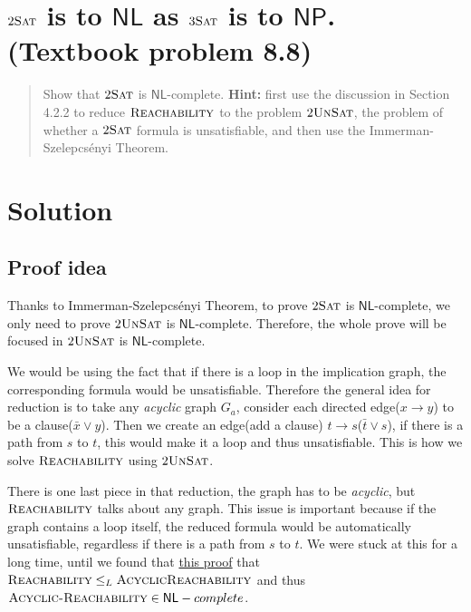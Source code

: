 
\newtheorem{theorem}{Theorem}

\maketitle
\thispagestyle{firststyle}
\vspace{-2.0cm}

\section{$2\textsc{Sat}$ is to $\mathsf{NL}$ as $3\textsc{Sat}$ is to $\mathsf{NP}$. (Textbook problem 8.8)}
\begin{quote}
    Show that $2\textsc{Sat}$ is $\mathsf{NL}$-complete.
    {\bf Hint:} first use the discussion in Section 4.2.2 to reduce
    $\textsc{Reachability}$ to the problem $2\textsc{UnSat}$,
    the problem of whether a $2\textsc{Sat}$ formula is unsatisfiable,
    and then use the Immerman-Szelepcs\'{e}nyi Theorem.
\end{quote}

\section*{Solution}

\subsection*{Proof idea}

Thanks to Immerman-Szelepcs\'{e}nyi Theorem, to prove $2\textsc{Sat}$ is $\mathsf{NL}$-complete, we only need to prove $2\textsc{UnSat}$ is $\mathsf{NL}$-complete.
Therefore, the whole prove will be focused in $2\textsc{UnSat}$ is $\mathsf{NL}$-complete.

We would be using the fact that if there is a loop in the implication graph, the corresponding formula would be unsatisfiable.
Therefore the general idea for reduction is to take any \textit{acyclic} graph $G_a$, consider each directed edge($x \rightarrow y$) to be a clause($\bar{x} \vee y$).
Then we create an edge(add a clause) $t \rightarrow s$($\bar{t} \vee s$), if there is a path from $s$ to $t$, this would make it a loop and thus unsatisfiable.
This is how we solve $\textsc{Reachability}$ using $2\textsc{UnSat}$.

There is one last piece in that reduction, the graph has to be \textit{acyclic}, but $\textsc{Reachability}$ talks about any graph.
This issue is important because if the graph contains a loop itself, the reduced formula would be automatically unsatisfiable, regardless if there is a path from $s$ to $t$.
We were stuck at this for a long time, until we found that \href{https://people.cs.umass.edu/~barring/cs601sum03/hw/4sol.html}{this proof} that $\textsc{Reachability} \le_L \textsc{AcyclicReachability}$ and thus $\textsc{Acyclic-Reachability} \in \mathsf{NL}-complete$.

